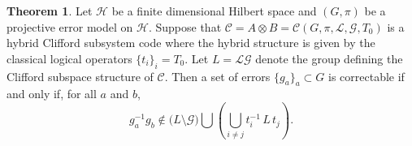 \documentclass[11pt]{article}
\theoremstyle{definition}
\newtheorem{theorem}{Theorem}
\newcommand{\calC}{\mathcal{C}}
\newcommand{\calG}{\mathcal{G}}
\newcommand{\calH}{\mathcal{H}}
\newcommand{\calL}{\mathcal{L}}
\begin{document}
\begin{theorem}\label{errorcorrecthm}
    Let $\calH$ be a finite dimensional Hilbert space and $(G,\pi)$ be a projective error model on $\calH$. Suppose that $\calC = A \otimes B = \calC(G,\pi,\calL,\calG,T_0)$ is a hybrid Clifford subsystem code where the hybrid structure is given by the classical logical operators $\{t_i\}_{i} = T_0$. Let $L = \calL\calG$ denote the group defining the Clifford subspace structure of $\calC$. Then a set of errors $\{g_a\}_{a} \subset G$ is correctable if and only if, for all $a$ and $b$,
    \begin{equation}\label{eqn:detectability condition}
        g_a^{-1}g_b \notin \big(L \setminus \calG\big) \bigcup \left( \bigcup_{i \neq j} t_i^{-1} \, L \, t_j \right).
    \end{equation}
\end{theorem}
\end{document}
